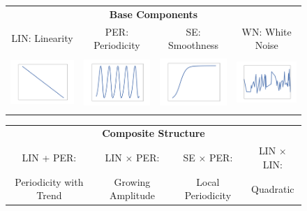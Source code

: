 \begin{subfigure}[b]{0.99\textwidth}\centering
\begin{tabular}{cccc}
\multicolumn{4}{c}{\bf Base Components} \rule{0pt}{6ex} \\ 
\small LIN: Linearity &\small PER: Periodicity &\small SE: Smoothness &\small WN: White Noise \rule{0pt}{2ex} \\
\includegraphics[height=2cm]{figs/kernel/kernelLIN.png} & \includegraphics[height=2cm]{figs/kernel/kernelPER.png} & \includegraphics[height=2cm]{figs/kernel/kernelSE.png} & \includegraphics[height=2cm]{figs/kernel/kernelWN.png}\\
\end{tabular}
\begin{tabular}{cccc}
\multicolumn{4}{c}{\bf Composite Structure} \rule{0pt}{4ex}  \\ 
\small LIN + PER: &\small LIN $\times$ PER: &\small SE $\times$ PER: &\small LIN $\times$ LIN: \rule{0pt}{2ex} \\
\small Periodicity with Trend &\small Growing Amplitude &\small Local Periodicity&\small Quadratic \rule{0pt}{2ex} \\

\end{tabular}
\end{subfigure}
